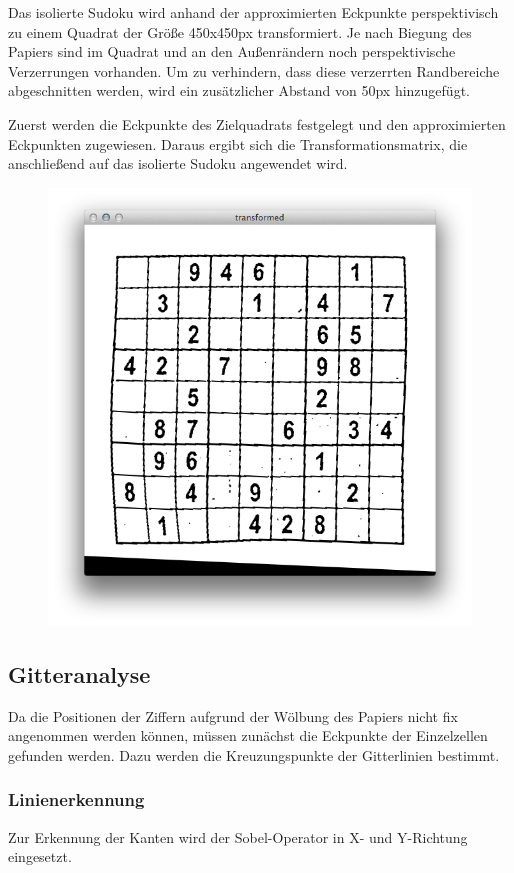 Das isolierte Sudoku wird anhand der approximierten Eckpunkte perspektivisch zu einem Quadrat der Größe 450x450px transformiert.
Je nach Biegung des Papiers sind im Quadrat und an den Außenrändern noch perspektivische Verzerrungen vorhanden. Um zu verhindern, dass diese verzerrten Randbereiche abgeschnitten werden, wird ein zusätzlicher Abstand von 50px hinzugefügt.

Zuerst werden die Eckpunkte des Zielquadrats festgelegt und den approximierten Eckpunkten zugewiesen. Daraus ergibt sich die Transformationsmatrix, die anschließend auf das isolierte Sudoku angewendet wird.

\begin{figure}[h!]
    \begin{center}
        \includegraphics[width=.5\textwidth]{Abbildungen/transformed}
    \end{center}
\end{figure}


\subsection{Gitteranalyse}
Da die Positionen der Ziffern aufgrund der Wölbung des Papiers nicht fix angenommen werden können, müssen zunächst die Eckpunkte der Einzelzellen gefunden werden.
Dazu werden die Kreuzungspunkte der Gitterlinien bestimmt.

\subsubsection{Linienerkennung}
Zur Erkennung der Kanten wird der Sobel-Operator in X- und Y-Richtung eingesetzt.

